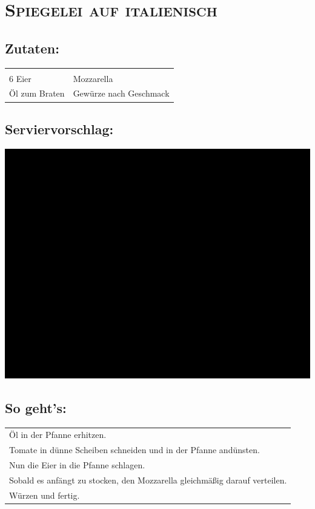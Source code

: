 \section{\textsc{Spiegelei auf italienisch}}

\subsection*{Zutaten:}

\begin{tabular}{p{7.5cm} p{7.5cm}}
	& \\
	6 Eier & Mozzarella \\
	Öl zum Braten & Gewürze nach Geschmack
\end{tabular}

\subsection*{Serviervorschlag:}

\includegraphics[width=\textwidth]{img/ph.jpg}

\subsection*{So geht's:}

\begin{tabular}{p{15cm}}
	\\
  Öl in der Pfanne erhitzen.\\
  Tomate in dünne Scheiben schneiden und in der Pfanne andünsten.\\
  Nun die Eier in die Pfanne schlagen.\\
  Sobald es anfängt zu stocken, den Mozzarella gleichmäßig darauf verteilen.\\
  Würzen und fertig.
\end{tabular}
